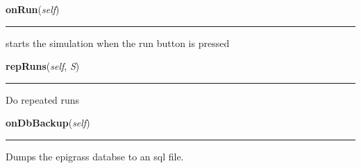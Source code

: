     \label{epigrass:MainPanel_Impl:onRun}

    \vspace{0.5ex}

    \begin{boxedminipage}{\textwidth}

    \raggedright \textbf{onRun}(\textit{self})

    \vspace{-1.5ex}

    \rule{\textwidth}{0.5\fboxrule}
    starts the simulation when the run button is pressed

    \vspace{1ex}

    \end{boxedminipage}

    \label{epigrass:MainPanel_Impl:repRuns}

    \vspace{0.5ex}

    \begin{boxedminipage}{\textwidth}

    \raggedright \textbf{repRuns}(\textit{self}, \textit{S})

    \vspace{-1.5ex}

    \rule{\textwidth}{0.5\fboxrule}
    Do repeated runs

    \vspace{1ex}

    \end{boxedminipage}

    \label{epigrass:MainPanel_Impl:onDbBackup}

    \vspace{0.5ex}

    \begin{boxedminipage}{\textwidth}

    \raggedright \textbf{onDbBackup}(\textit{self})

    \vspace{-1.5ex}

    \rule{\textwidth}{0.5\fboxrule}
    Dumps the epigrass databse to an sql file.

    \vspace{1ex}

    \end{boxedminipage}

